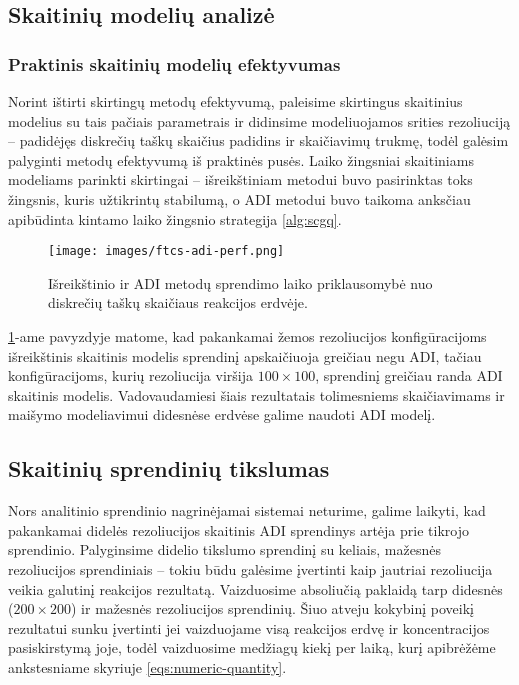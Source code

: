 \subsection{Skaitinių modelių analizė}


\subsubsection*{Praktinis skaitinių modelių efektyvumas}

Norint ištirti skirtingų metodų efektyvumą, paleisime skirtingus skaitinius modelius su tais pačiais parametrais ir didinsime modeliuojamos srities rezoliuciją -- padidėjęs diskrečių taškų skaičius padidins ir skaičiavimų trukmę, todėl galėsim palyginti metodų efektyvumą iš praktinės pusės. Laiko žingsniai skaitiniams modeliams parinkti skirtingai -- išreikštiniam metodui buvo pasirinktas toks žingsnis, kuris užtikrintų stabilumą, o ADI metodui buvo taikoma anksčiau apibūdinta kintamo laiko žingsnio strategija \eqref{alg:scgq}.

\begin{figure}[h!]
  \centering
  \texttt{[image: images/ftcs-adi-perf.png]}
  \caption{Išreikštinio ir ADI metodų sprendimo laiko priklausomybė nuo diskrečių taškų skaičiaus reakcijos erdvėje.}
  \label{fig:adi-ftcs-solve-time-comparison}
\end{figure}

\ref{fig:adi-ftcs-solve-time-comparison}-ame pavyzdyje matome, kad pakankamai žemos rezoliucijos konfigūracijoms išreikštinis skaitinis modelis sprendinį apskaičiuoja greičiau negu ADI, tačiau konfigūracijoms, kurių rezoliucija viršija $100\times100$, sprendinį greičiau randa ADI skaitinis modelis. Vadovaudamiesi šiais rezultatais tolimesniems skaičiavimams ir maišymo modeliavimui didesnėse erdvėse galime naudoti ADI modelį.

\subsection*{Skaitinių sprendinių tikslumas}

Nors analitinio sprendinio nagrinėjamai sistemai neturime, galime laikyti, kad pakankamai didelės rezoliucijos skaitinis ADI sprendinys artėja prie tikrojo sprendinio. Palyginsime didelio tikslumo sprendinį su keliais, mažesnės rezoliucijos sprendiniais -- tokiu būdu galėsime įvertinti kaip jautriai rezoliucija veikia galutinį reakcijos rezultatą. Vaizduosime absoliučią paklaidą tarp didesnės ($200\times200$) ir mažesnės rezoliucijos sprendinių. Šiuo atveju kokybinį poveikį rezultatui sunku įvertinti jei vaizduojame visą reakcijos erdvę ir koncentracijos pasiskirstymą joje, todėl vaizduosime medžiagų kiekį per laiką, kurį apibrėžėme ankstesniame skyriuje \eqref{eqs:numeric-quantity}.

